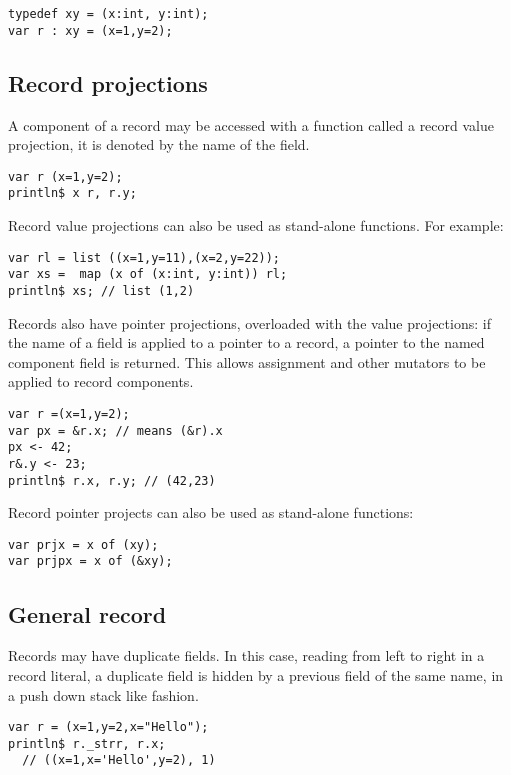 \documentclass[oneside]{book}
\begin{document}
\begin{verbatim}
typedef xy = (x:int, y:int);
var r : xy = (x=1,y=2);
\end{verbatim}

\subsection{Record projections}
A component of a record may be accessed with a 
function called a record value projection, it is denoted
by the name of the field.

\begin{verbatim}
var r (x=1,y=2);
println$ x r, r.y;
\end{verbatim}

Record value projections can also be used as stand-alone
functions. For example:

\begin{verbatim}
var rl = list ((x=1,y=11),(x=2,y=22));
var xs =  map (x of (x:int, y:int)) rl;
println$ xs; // list (1,2)
\end{verbatim}

Records also have pointer projections, overloaded with
the value projections: if the name of
a field is applied to a pointer to a record,
a pointer to the named component field is returned.
This allows assignment and other mutators to be
applied to record components.

\begin{verbatim}
var r =(x=1,y=2);
var px = &r.x; // means (&r).x
px <- 42;
r&.y <- 23;
println$ r.x, r.y; // (42,23)
\end{verbatim}

Record pointer projects can also be used as stand-alone functions:

\begin{verbatim}
var prjx = x of (xy);
var prjpx = x of (&xy);
\end{verbatim}

\subsection{General record}
Records may have duplicate fields. In this case, reading from left
to right in a record literal, a duplicate field is hidden by a previous 
field of the same name, in a push down stack like fashion.
 
\begin{verbatim}
var r = (x=1,y=2,x="Hello");
println$ r._strr, r.x;
  // ((x=1,x='Hello',y=2), 1)
\end{verbatim}
\end{document}
